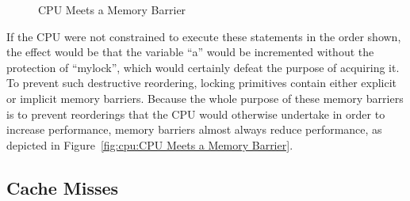 \begin{figure}[tb]
\begin{center}
\end{center}
\caption{CPU Meets a Memory Barrier}
\end{figure}

If the CPU were not constrained to execute these statements in the
order shown, the effect would be that the variable ``a'' would be
incremented without the protection of ``mylock'', which would certainly
defeat the purpose of acquiring it.
To prevent such destructive reordering, locking primitives contain
either explicit or implicit memory barriers.
Because the whole purpose of these memory barriers is to prevent reorderings
that the CPU would otherwise undertake in order to increase performance,
memory barriers almost always reduce performance, as depicted in
Figure~\ref{fig:cpu:CPU Meets a Memory Barrier}.

\subsection{Cache Misses}
\label{sec:cpu:Cache Misses}

